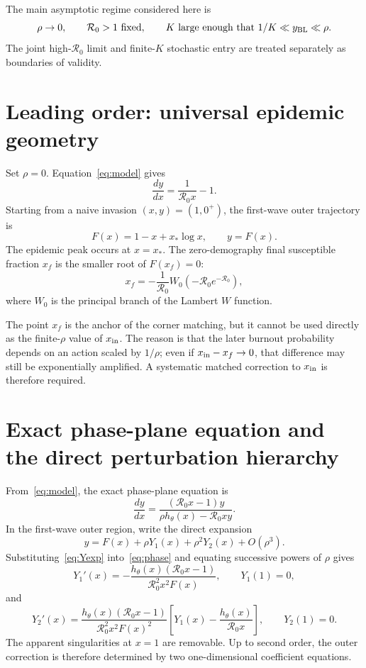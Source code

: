 \documentclass[11pt,a4paper]{article}
\newcommand{\Rzero}{\mathcal R_0}
\newcommand{\BL}{y_{\rm BL}}
\newcommand{\xin}{x_{\rm in}}
\newcommand{\xf}{x_f}
\newcommand{\xs}{x_*}
\begin{document}
The main asymptotic regime considered here is
\begin{equation}
\label{eq:limit}
\rho\to0,
\qquad \Rzero>1\ \text{fixed},
\qquad K\ \text{large enough that }1/K\ll\BL\ll\rho.
\end{equation}
The joint high-$\Rzero$ limit and finite-$K$ stochastic entry are treated separately as boundaries of validity.

\section{Leading order: universal epidemic geometry}
Set $\rho=0$. Equation~\eqref{eq:model} gives
\[
\frac{dy}{dx}=\frac1{\Rzero x}-1.
\]
Starting from a naive invasion $(x,y)=(1,0^+)$, the first-wave outer trajectory is
\begin{equation}
\label{eq:F}
F(x)=1-x+\xs\log x,
\qquad y=F(x).
\end{equation}
The epidemic peak occurs at $x=\xs$. The zero-demography final susceptible fraction $\xf$ is the smaller root of $F(\xf)=0$:
\begin{equation}
\label{eq:xf}
\xf=-\frac1{\Rzero}W_0(-\Rzero e^{-\Rzero}),
\end{equation}
where $W_0$ is the principal branch of the Lambert $W$ function.

The point $\xf$ is the anchor of the corner matching, but it cannot be used directly as the finite-$\rho$ value of $\xin$. The reason is that the later burnout probability depends on an action scaled by $1/\rho$; even if $\xin-\xf\to0$, that difference may still be exponentially amplified. A systematic matched correction to $\xin$ is therefore required.

\section{Exact phase-plane equation and the direct perturbation hierarchy}
From~\eqref{eq:model}, the exact phase-plane equation is
\begin{equation}
\label{eq:phase}
\frac{dy}{dx}
=\frac{(\Rzero x-1)y}{\rho h_\theta(x)-\Rzero xy}.
\end{equation}
In the first-wave outer region, write the direct expansion
\begin{equation}
\label{eq:Yexp}
y=F(x)+\rho Y_1(x)+\rho^2Y_2(x)+O(\rho^3).
\end{equation}
Substituting~\eqref{eq:Yexp} into~\eqref{eq:phase} and equating successive powers of $\rho$ gives
\begin{equation}
\label{eq:Y1}
Y_1'(x)
=-\frac{h_\theta(x)(\Rzero x-1)}{\Rzero^2x^2F(x)},
\qquad Y_1(1)=0,
\end{equation}
and
\begin{equation}
\label{eq:Y2}
Y_2'(x)
=\frac{h_\theta(x)(\Rzero x-1)}{\Rzero^2x^2F(x)^2}
\left[Y_1(x)-\frac{h_\theta(x)}{\Rzero x}\right],
\qquad Y_2(1)=0.
\end{equation}
The apparent singularities at $x=1$ are removable. Up to second order, the outer correction is therefore determined by two one-dimensional coefficient equations.
\end{document}
